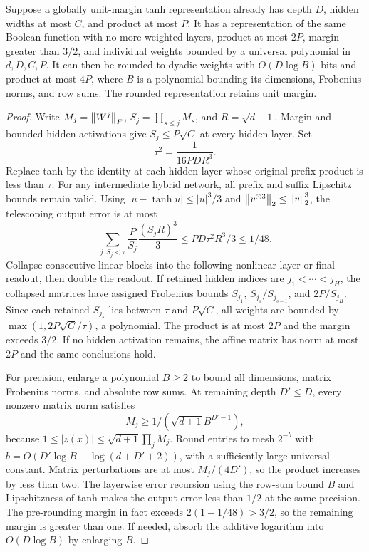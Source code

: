 \begin{lemma}
\label{lem:physical}
Suppose a globally unit-margin tanh representation already has
depth $D$, hidden widths at most $C$, and product at most $P$.
It has a representation of the same Boolean function with no more
weighted layers, product at most $2P$, margin greater than $3/2$,
and individual weights bounded by a universal polynomial in
$d,D,C,P$. It can then be rounded to dyadic weights with
$O(D\log B)$ bits and product at most $4P$, where $B$ is a
polynomial bounding its dimensions, Frobenius norms, and row sums.
The rounded representation retains unit margin.
\end{lemma}
\begin{proof}
Write $M_j=\left\lVert W^j\right\rVert_F$, $S_j=\prod_{s\le j}M_s$, and
$R=\sqrt{d+1}$. Margin and bounded hidden activations give
$S_j\le P\sqrt C$ at every hidden layer. Set
\[
 \tau^2=\frac1{16PD R^3}.
\]
Replace tanh by the identity at each hidden layer whose original
prefix product is less than $\tau$. For any intermediate hybrid
network, all prefix and suffix Lipschitz bounds remain valid.
Using $|u-\tanh u|\le|u|^3/3$ and
$\left\lVert v^{\odot3}\right\rVert_2\le\left\lVert v\right\rVert_2^3$, the telescoping output
error is at most
\[
 \sum_{j:S_j<\tau}\frac{P}{S_j}\frac{(S_jR)^3}{3}
 \le PD\tau^2R^3/3\le1/48.
\]
Collapse consecutive linear blocks into the following nonlinear
layer or final readout, then double the readout. If retained hidden
indices are $j_1<\cdots<j_H$, the collapsed matrices have assigned
Frobenius bounds
$S_{j_1}$, $S_{j_s}/S_{j_{s-1}}$, and $2P/S_{j_H}$.
Since each retained $S_{j_s}$ lies between $\tau$ and $P\sqrt C$,
all weights are bounded by $\max(1,2P\sqrt C/\tau)$, a polynomial.
The product is at most $2P$ and the margin exceeds $3/2$.
If no hidden activation remains, the affine matrix has norm at
most $2P$ and the same conclusions hold.

For precision, enlarge a polynomial $B\ge2$ to bound all dimensions,
matrix Frobenius norms, and absolute row sums. At remaining depth
$D'\le D$, every nonzero matrix norm satisfies
\[
 M_j\ge1/(\sqrt{d+1}B^{D'-1}),
\]
because $1\le|z(x)|\le\sqrt{d+1}\prod_jM_j$.
Round entries to mesh $2^{-b}$ with
$b=O(D'\log B+\log(d+D'+2))$, with a sufficiently large
universal constant. Matrix perturbations are at most $M_j/(4D')$,
so the product increases by less than two. The layerwise error
recursion using the row-sum bound $B$ and Lipschitzness of tanh
makes the output error less than $1/2$ at the same precision.
The pre-rounding margin in fact exceeds $2(1-1/48)>3/2$, so the
remaining margin is greater than one. If needed, absorb the additive
logarithm into $O(D\log B)$ by enlarging $B$.
\end{proof}

